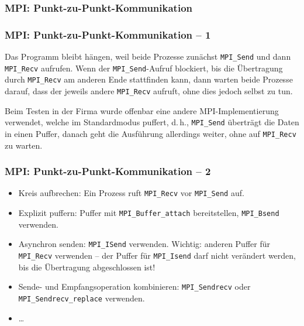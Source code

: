 \documentclass{beamer}
\begin{document}
\begin{frame}
  \frametitle{MPI: Punkt-zu-Punkt-Kommunikation}
  
\end{frame}

\begin{frame}
  \frametitle{MPI: Punkt-zu-Punkt-Kommunikation – 1}
  Das Programm bleibt hängen, weil beide Prozesse zunächst \lstinline{MPI_Send} und dann \lstinline{MPI_Recv} aufrufen.
  Wenn der \lstinline{MPI_Send}-Aufruf blockiert, bis die Übertragung durch \lstinline{MPI_Recv} am anderen Ende stattfinden kann,
  dann warten beide Prozesse darauf, dass der jeweils andere \lstinline{MPI_Recv} aufruft, ohne dies jedoch selbst zu tun.
  
  Beim Testen in der Firma wurde offenbar eine andere MPI-Implementierung verwendet,
  welche im Standardmodus puffert, d.\,h., \lstinline{MPI_Send} überträgt die Daten in einen Puffer,
  danach geht die Ausführung allerdings weiter, ohne auf \lstinline{MPI_Recv} zu warten.
\end{frame}

\begin{frame}
  \frametitle{MPI: Punkt-zu-Punkt-Kommunikation – 2}
  \begin{itemize}
  \item Kreis aufbrechen:
    Ein Prozess ruft \lstinline{MPI_Recv} vor \lstinline{MPI_Send} auf.
  \item Explizit puffern:
    Puffer mit \lstinline{MPI_Buffer_attach} bereitstellen,
    \lstinline{MPI_Bsend} verwenden.
  \item Asynchron senden:
    \lstinline{MPI_ISend} verwenden.
    Wichtig: anderen Puffer für \lstinline{MPI_Recv} verwenden –
    der Puffer für \lstinline{MPI_Isend} darf nicht verändert werden, bis die Übertragung abgeschlossen ist!
  \item Sende- und Empfangsoperation kombinieren:
    \lstinline{MPI_Sendrecv} oder \lstinline{MPI_Sendrecv_replace} verwenden.
  \item …
  \end{itemize}
\end{frame}
\end{document}
